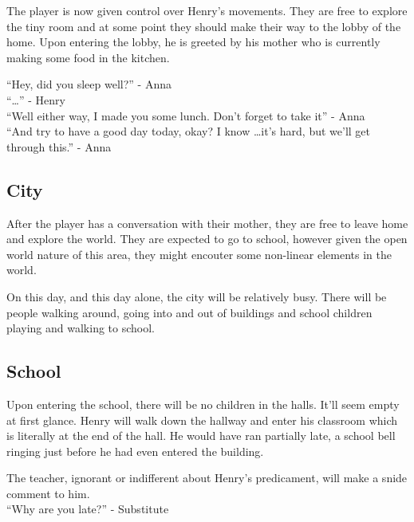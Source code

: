 \documentclass[12pt, a4paper, titlepage]{article}
\begin{document}
            The player is now given control over Henry's movements. They are free to explore the tiny room and at some point
            they should make their way to the lobby of the home. Upon entering the lobby, he is greeted by his mother who is
            currently making some food in the kitchen.

            ``Hey, did you sleep well?'' - Anna
            \\

            ``\ldots'' - Henry
            \\

            ``Well either way, I made you some lunch. Don't forget to take it'' - Anna
            \\

            ``And try to have a good day today, okay? I know \ldots it's hard, but we'll get through this.'' - Anna

        \subsection{City}

            After the player has a conversation with their mother, they are free to leave home and explore the world. They are
            expected to go to school, however given the open world nature of this area, they might encouter some non-linear elements in the
            world.

            On this day, and this day alone, the city will be relatively busy. There will be people walking around, going into and out of buildings and school children
            playing and walking to school.

        \subsection{School}

            Upon entering the school, there will be no children in the halls. It'll seem empty at first glance. Henry will walk down the hallway and enter 
            his classroom which is literally at the end of the hall. He would have ran partially late, a school bell ringing just before he had even entered the building.

            The teacher, ignorant or indifferent about Henry's predicament, will make a snide comment to him.
            \\

            ``Why are you late?'' - Substitute
            \\
\end{document}
